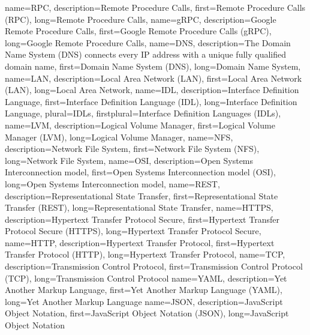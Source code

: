 {%
    name={RPC},
    description={Remote Procedure Calls},
    first={Remote Procedure Calls (RPC)},
    long={Remote Procedure Calls},
}
{%
    name={gRPC},
    description={Google Remote Procedure Calls},
    first={Google Remote Procedure Calls (gRPC)},
    long={Google Remote Procedure Calls},
}
{%
    name={DNS},
    description={The Domain Name System (DNS) connects every IP address with a unique fully qualified domain name},
    first={Domain Name System (DNS)},
    long={Domain Name System},
}
{%
    name={LAN},
    description={Local Area Network (LAN)},
    first={Local Area Network (LAN)},
    long={Local Area Network},
}
{%
    name={IDL},
    description={Interface Definition Language},
    first={Interface Definition Language (IDL)},
    long={Interface Definition Language},
    plural={IDLs},
    firstplural={Interface Definition Languages (IDLs)},
}
{%
    name={LVM},
    description={Logical Volume Manager},
    first={Logical Volume Manager (LVM)},
    long={Logical Volume Manager},
}
{%
    name={NFS},
    description={Network File System},
    first={Network File System (NFS)},
    long={Network File System},
}
{%
    name={OSI},
    description={Open Systems Interconnection model},
    first={Open Systems Interconnection model (OSI)},
    long={Open Systems Interconnection model},
}
{%
    name={REST},
    description={Representational State Transfer},
    first={Representational State Transfer (REST)},
    long={Representational State Transfer},
}
{%
    name={HTTPS},
    description={Hypertext Transfer Protocol Secure},
    first={Hypertext Transfer Protocol Secure (HTTPS)},
    long={Hypertext Transfer Protocol Secure},
}
{%
    name={HTTP},
    description={Hypertext Transfer Protocol},
    first={Hypertext Transfer Protocol (HTTP)},
    long={Hypertext Transfer Protocol},
}
{%
    name={TCP},
    description={Transmission Control Protocol},
    first={Transmission Control Protocol (TCP)},
    long={Transmission Control Protocol}
}
{%
    name={YAML},
    description={Yet Another Markup Language},
    first={Yet Another Markup Language (YAML)},
    long={Yet Another Markup Language}
}
{%
    name={JSON},
    description={JavaScript Object Notation},
    first={JavaScript Object Notation (JSON)},
    long={JavaScript Object Notation}
}
